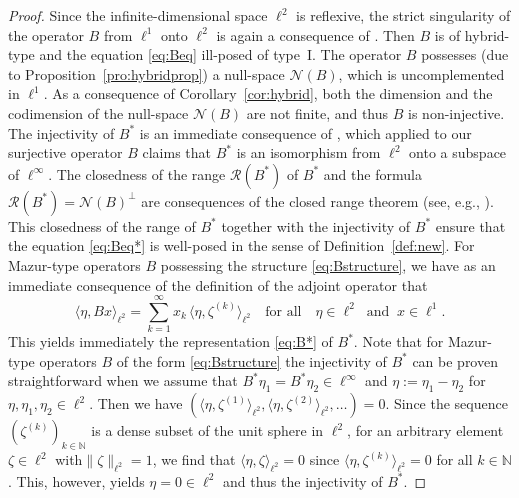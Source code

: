 \documentclass[12pt,twoside,reqno]{amsart}
\theoremstyle{definition}
\numberwithin{equation}{section}
\begin{document}
\begin{proof} Since the infinite-dimensional space $\ell^2$ is reflexive, the strict singularity of the operator $B$ from $\ell^1$ onto $\ell^2$ is again a consequence of \cite[Theorem,~item~(b),~p.~334]{GoldThorp63}. Then $B$ is of hybrid-type and the equation \eqref{eq:Beq} ill-posed of type~I. The operator $B$ possesses (due to Proposition~\ref{pro:hybridprop}) a null-space $\mathcal{N}(B)$, which is uncomplemented in $\ell^1$. As a consequence of Corollary~\ref{cor:hybrid}, both the dimension and the codimension of the null-space $\mathcal{N}(B)$ are not finite, and thus $B$ is non-injective.
The injectivity of $B^*$ is an immediate consequence of \cite[Theorem~3.1.22(a)]{Meg98}, which applied to our surjective operator $B$ claims that $B^*$ is an isomorphism from $\ell^2$ onto
a subspace of $\ell^\infty$. The closedness of the range $\mathcal{R}(B^*)$ of $B^*$ and the formula $\mathcal{R}(B^*)=\mathcal{N}(B)^\perp$  are consequences of the closed range theorem (see, e.g., \cite[Theorem of Chapt.VII.5]{Yosida80}). This closedness of the range of $B^*$ together with the injectivity of $B^*$ ensure that the equation \eqref{eq:Beq*} is well-posed in the sense of Definition~\ref{def:new}.
For Mazur-type operators $B$ possessing the structure \eqref{eq:Bstructure}, we have as an immediate consequence of the definition of the adjoint operator that
$$\langle \eta,Bx \rangle_{\ell^2}=\sum_{k=1}^\infty x_k\,\langle \eta,\zeta^{(k)}\rangle_{\ell^2} \quad \mbox{for all} \quad \eta \in \ell^2 \;\;\mbox{and} \;\; x \in \ell^1. $$
This yields immediately the representation \eqref{eq:B*} of $B^*$.
Note that for Mazur-type operators $B$ of the form \eqref{eq:Bstructure} the injectivity of $B^*$ can be proven straightforward when we assume that $B^*\eta_1=B^*\eta_2 \in \ell^\infty$ and $\eta:=\eta_1-\eta_2$ for $\eta,\eta_1,\eta_2 \in \ell^2$. Then we have $(\langle\eta,\zeta^{(1)}\rangle_{\ell^2},\langle\eta,\zeta^{(2)}\rangle_{\ell^2},\ldots)=0$. Since the sequence $(\zeta^{(k)})_{k\in\mathbb{N}}$ is a dense subset of the unit sphere in $\ell^2$,
for an arbitrary element $\zeta \in \ell^2$ with$\|\zeta\|_{\ell^2}=1$, we find that $\langle\eta,\zeta\rangle_{\ell^2}=0$ since $\langle\eta,\zeta^{(k)}\rangle_{\ell^2}=0$ for all $k \in \mathbb{N}$. This, however, yields $\eta=0 \in \ell^2$ and thus the injectivity of $B^*$.
\end{proof}
\end{document}
